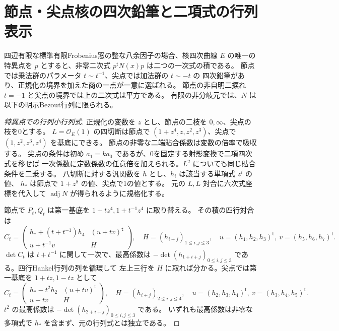 \section{節点・尖点核の四次鉛筆と二項式の行列表示}
\label{sec:singular-elliptic-cofactor-pencil}
\begin{theorem}\label{thm:singular-elliptic-cofactor-pencil}
四辺有限な標準有限Frobenius窓の整な八余因子の場合、核四次曲線 $E$ の唯一の特異点を
$p$ とすると、非零二次式 $p^{\mathsf t}N(x)p$ は二つの一次式の積である。
節点では乗法群のパラメータ $t\sim t^{-1}$、尖点では加法群の $t\sim-t$ の
四次鉛筆があり、正規化の境界を加えた商の一点が一意に選ばれる。
節点の非自明二捩れ $t=-1$ と尖点の境界では上の二次式は平方である。
有限の非分岐元では、$N$ は以下の明示Bezout行列に限られる。
\end{theorem}
\begin{proof}[特異点での行列小行列式]
正規化の変数を $z$ とし、節点の二枝を $0,\infty$、尖点の枝を0とする。
$L=\mathcal O_E(1)$ の四切断は節点で
$(1+z^4,z,z^2,z^3)$、尖点で $(1,z^2,z^3,z^4)$ を基底にできる。
節点の非零な二端貼合係数は変数の倍率で吸収する。
尖点の条件は初め $a_1=k a_0$ であるが、0を固定する射影変換で二項四次式を移せば
一次係数に定数係数の任意倍を加えられる。$L^2$ についても同じ貼合条件を二乗する。
八切断に対する汎関数を $h$ とし、$h_i$ は該当する単項式 $z^i$ の値、
$h_*$ は節点で $1+z^8$ の値、尖点で1の値とする。
元の $L,L$ 対合に六次式座標を代入して $\operatorname{adj}N$ が得られるように規格化する。

節点で $P_t,Q_t$ は第一基底を $1+t z^4,1+t^{-1}z^4$ に取り替える。
その積の四行対合は
\[
 C_t=\begin{pmatrix}h_*+(t+t^{-1})h_4&(u+t v)^{\mathsf t}\\
 u+t^{-1}v&H\end{pmatrix},
\quad H=(h_{i+j})_{1\le i,j\le3},\quad
 u=(h_1,h_2,h_3)^{\mathsf t},\ v=(h_5,h_6,h_7)^{\mathsf t}.
\]
$\det C_t$ は $t+t^{-1}$ に関して一次で、最高係数は
$-\det(h_{1+i+j})_{0\le i,j\le3}$ である。四行Hankel行列の列を循環して
左上三行を $H$ に取れば分かる。尖点では第一基底を $1+tz,1-tz$ として
\[
 C_t=\begin{pmatrix}h_*-t^2 h_2&(u+t v)^{\mathsf t}\\u-t v&H\end{pmatrix},
\quad H=(h_{i+j})_{2\le i,j\le4},\quad
 u=(h_2,h_3,h_4)^{\mathsf t},\ v=(h_3,h_4,h_5)^{\mathsf t}.
\]
$t^2$ の最高係数は $-\det(h_{2+i+j})_{0\le i,j\le3}$ である。
いずれも最高係数は非零な多項式で $h_*$ を含まず、元の行列式とは独立である。


\end{proof}
